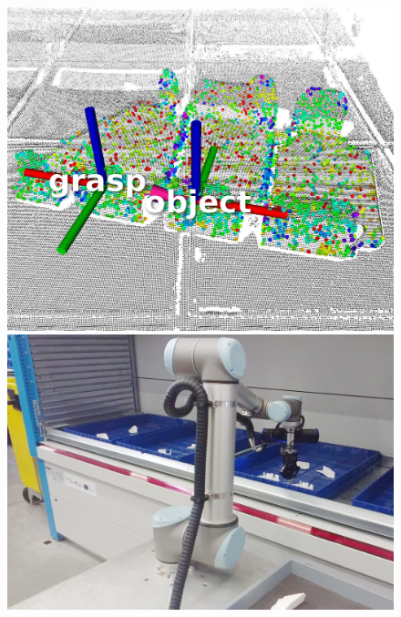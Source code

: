 \begin{figure}[h!]
{\begin{tcolorbox}
	\includegraphics[height=.15\textheight]{Cap5/Figuras/picking_embraer/perception-5}
	\includegraphics[height=.15\textheight]{Cap5/Figuras/picking_embraer/back-5}

\end{tcolorbox}}
\end{figure}
